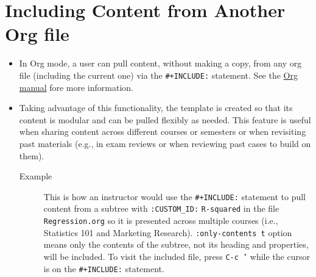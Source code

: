 \documentclass[10pt,article]{article}
\begin{document}
\section{Including Content from Another Org file}
\label{sec:orgb5a741c}
\begin{itemize}
\item In Org mode, a user can pull content, without making a copy, from any org file (including
the current one) via the \texttt{\#+INCLUDE:} statement. See the \href{https://orgmode.org/manual/Include-files.html}{Org manual} fore more information.

\item Taking advantage of this functionality, the template is created so that its
content is modular and can be pulled flexibly as needed. This feature is
useful when sharing content across different courses or semesters or when
revisiting past materials (e.g., in exam reviews or when reviewing past
cases to build on them).

\begin{description}
\item[{Example}] This is how an instructor would use the \texttt{\#+INCLUDE:} statement
to pull content from a subtree with \texttt{:CUSTOM\_ID:} \texttt{R-squared}
in the file \texttt{Regression.org} so it is presented across multiple
courses (i.e., Statistics 101 and Marketing Research).
\texttt{:only-contents t} option means only the contents of the
subtree, not its heading and properties, will be included. To
visit the included file, press \texttt{C-c '} while the cursor is on
the \texttt{\#+INCLUDE:} statement.

\end{description}
\end{itemize}
\end{document}
